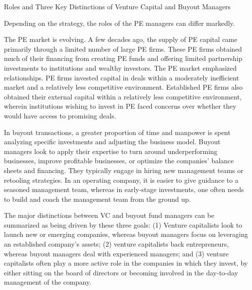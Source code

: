 \documentclass[11pt]{article}
\begin{document}
Roles and Three Key Distinctions of Venture Capital and Buyout Managers

Depending on the strategy, the roles of the PE managers can differ markedly.

The PE market is evolving. A few decades ago, the supply of PE capital came primarily through a limited number of large PE firms. These PE firms obtained much of their financing from creating PE funds and offering limited partnership investments to institutions and wealthy investors. The PE market emphasized relationships. PE firms invested capital in deals within a moderately inefficient market and a relatively less competitive environment. Established PE firms also obtained their external capital within a relatively less competitive environment, wherein institutions wishing to invest in PE faced concerns over whether they would have access to promising deals.

In buyout transactions, a greater proportion of time and manpower is spent analyzing specific investments and adjusting the business model. Buyout managers look to apply their expertise to turn around underperforming businesses, improve profitable businesses, or optimize the companies' balance sheets and financing. They typically engage in hiring new management teams or retooling strategies. In an operating company, it is easier to give guidance to a seasoned management team, whereas in early-stage investments, one often needs to build and coach the management team from the ground up.

The major distinctions between VC and buyout fund managers can be summarized as being driven by these three goals: (1) Venture capitalists look to launch new or emerging companies, whereas buyout managers focus on leveraging an established company's assets; (2) venture capitalists back entrepreneurs, whereas buyout managers deal with experienced managers; and (3) venture capitalists often play a more active role in the companies in which they invest, by either sitting on the board of directors or becoming involved in the day-to-day management of the company.
\end{document}
